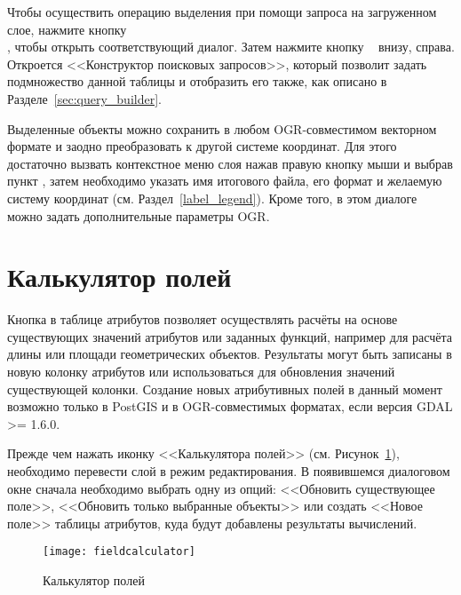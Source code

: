Чтобы осуществить операцию выделения при помощи запроса на загруженном слое,
нажмите кнопку \\
, чтобы открыть
соответствующий диалог. Затем нажмите кнопку \
 внизу, справа. Откроется <<Конструктор поисковых
запросов>>, который позволит задать подмножество данной таблицы и отобразить
его также, как описано в Разделе~\ref{sec:query_builder}.

\index{конструктор поисковых запросов!сохранить выделение как слой]}

Выделенные объекты можно сохранить в любом OGR-совместимом векторном формате
и заодно преобразовать к другой системе координат. Для этого достаточно
вызвать контекстное меню слоя нажав правую кнопку мыши и выбрав пункт
\dropmenuopt{Сохранить выделение как\ldots}, затем необходимо указать имя
итогового файла, его формат и желаемую систему координат (см. Раздел~\ref{label_legend}).
Кроме того, в этом диалоге можно задать дополнительные параметры OGR.

\section{Калькулятор полей}\label{sec:field_calculator}

Кнопка  в
таблице атрибутов позволяет осуществлять расчёты на основе существующих
значений атрибутов или заданных функций, например для расчёта длины или
площади геометрических объектов. Результаты могут быть записаны в новую
колонку атрибутов или использоваться для обновления значений существующей
колонки. Создание новых атрибутивных полей в данный момент возможно только
в PostGIS и в OGR-совместимых форматах, если версия GDAL >= 1.6.0.

Прежде чем нажать иконку <<Калькулятора полей>> (см. Рисунок~\ref{fig:field_calculator}),
необходимо перевести слой в режим редактирования. В появившемся диалоговом
окне сначала необходимо выбрать одну из опций: <<Обновить существующее поле>>,
<<Обновить только выбранные объекты>> или создать <<Новое поле>> таблицы
атрибутов, куда будут добавлены результаты вычислений.

\begin{figure}[ht]
  \centering
    \texttt{[image: fieldcalculator]}
    \caption{Калькулятор полей \wincaption}\label{fig:field_calculator}
\end{figure}

